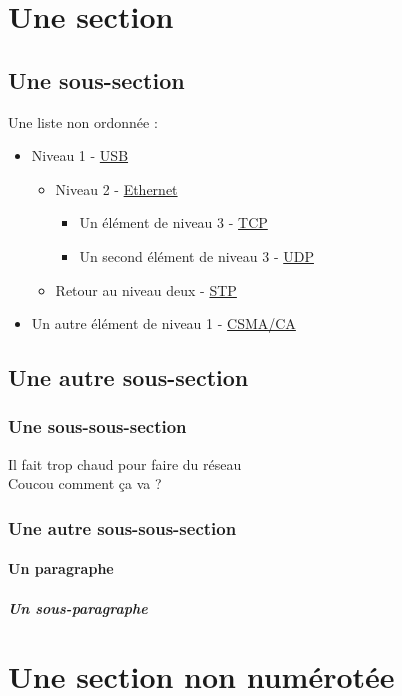 \section{Une section}

\subsection{Une sous-section}

Une liste non ordonnée :
\begin{itemize}
    \item Niveau 1 - \href{https://fr.wikipedia.org/wiki/USB}{USB}
    \begin{itemize}
        \item Niveau 2 - \href{https://fr.wikipedia.org/wiki/Ethernet}{Ethernet}
        \begin{itemize}
            \item Un élément de niveau 3 - \href{https://en.wikipedia.org/wiki/TCP}{TCP}
            \item Un second élément de niveau 3 - \href{https://en.wikipedia.org/wiki/UDP}{UDP}
        \end{itemize}
        \item Retour au niveau deux - \href{https://fr.wikipedia.org/wiki/Spanning_Tree_Protocol}{STP}
    \end{itemize}
    \item Un autre élément de niveau 1 - \href{https://fr.wikipedia.org/wiki/Carrier_Sense_Multiple_Access_with_Collision_Avoidance}{CSMA/CA}
\end{itemize}

\subsection{Une autre sous-section}
\subsubsection{Une sous-sous-section}
Il fait trop chaud pour faire du réseau \\
Coucou comment ça va ?
\subsubsection{Une autre sous-sous-section}
\paragraph{Un paragraphe}
\subparagraph{Un sous-paragraphe}
\section*{Une section non numérotée}

